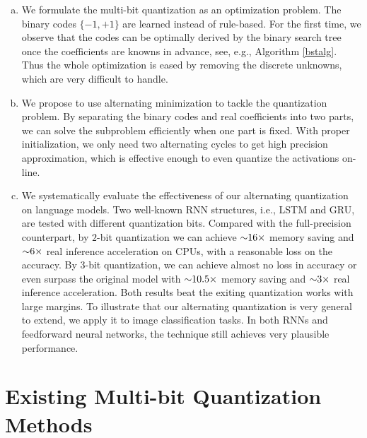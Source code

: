 \documentclass{article} %
\newcommand{\<}{\left\langle}
\renewcommand{\>}{\right\rangle}
\begin{document}
\begin{enumerate}[(a)]
	\item We formulate the multi-bit quantization as an optimization problem. The binary codes $\{-1, +1\}$ are learned instead of rule-based. For the first time, we observe that the codes can be optimally derived by the binary search tree once the coefficients are knowns in advance, see, e.g., Algorithm \ref{bstalg}.  Thus the whole optimization is eased by removing the discrete unknowns, which are very difficult to handle.  
		 
	\item We propose to use alternating minimization to tackle the quantization problem. By separating the binary codes and real coefficients into two parts, we can solve the subproblem efficiently when one part is fixed. With proper initialization, we only need two alternating cycles to get high precision approximation, which
	is effective enough to even quantize the activations on-line.   
	
	\item  
	We systematically evaluate the effectiveness of our alternating quantization on language models. Two well-known RNN structures, i.e., LSTM and GRU, are tested with different quantization bits. Compared with the full-precision counterpart, by $2$-bit quantization we can achieve $\scriptsize{\sim}16 \times$ memory saving and   $\scriptsize{\sim}6 \times$ real inference acceleration on CPUs, with a reasonable loss on the accuracy. By $3$-bit quantization, we can achieve almost no loss in accuracy or even surpass the original model with $\scriptsize{\sim}10.5 \times$ memory saving and $\scriptsize{\sim}3 \times$ real inference acceleration. Both results beat the exiting quantization works with large margins. To illustrate that our alternating quantization is very general to extend,  we apply it to image classification tasks. In both RNNs and feedforward neural networks, the technique still achieves very plausible performance.       
\end{enumerate}

\section{Existing Multi-bit Quantization Methods} \label{background}
\end{document}
